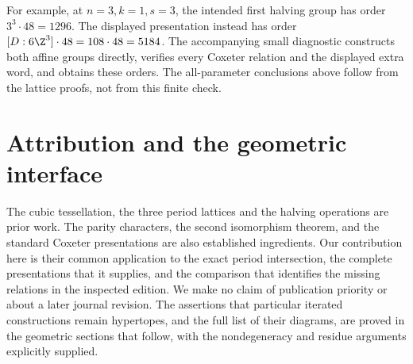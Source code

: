 For example, at $n=3,k=1,s=3$, the intended first halving group
has order $3^3\cdot48=1296$. The displayed presentation instead
has order $[D:6\Z^3]\cdot48=108\cdot48=5184$.
The accompanying small diagnostic constructs both affine groups
directly, verifies every Coxeter relation and the displayed extra
word, and obtains these orders. The all-parameter conclusions
above follow from the lattice proofs, not from this finite check.

\section{Attribution and the geometric interface}
The cubic tessellation, the three period lattices and the
halving operations are prior work. The parity characters,
the second isomorphism theorem, and the standard Coxeter
presentations are also established ingredients. Our contribution
here is their common application to the exact period intersection,
the complete presentations that it supplies, and the comparison
that identifies the missing relations in the inspected edition.
We make no claim of publication priority or about a later journal
revision. The assertions that particular iterated constructions
remain hypertopes, and the full list of their diagrams, are proved in the geometric sections that follow, with the nondegeneracy
and residue arguments explicitly supplied.
